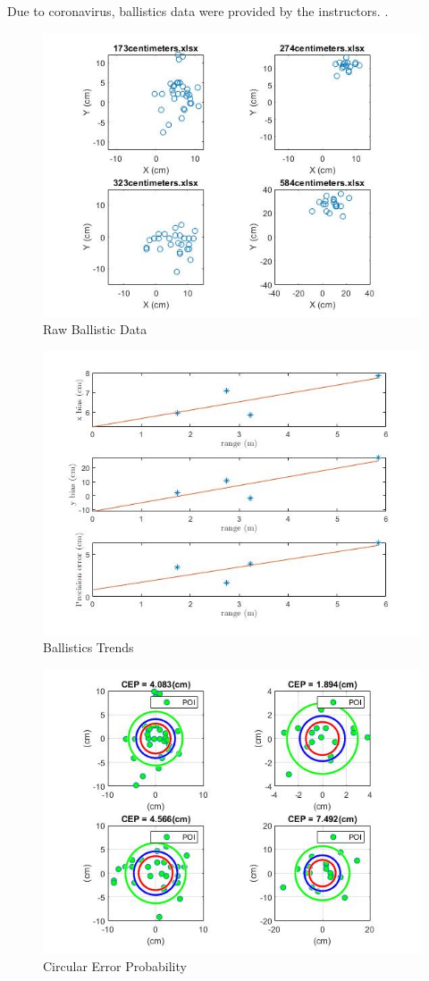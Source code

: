Due to coronavirus, ballistics data were provided by the instructors. .
\begin{figure}[h!]
    \centering
    \includegraphics[scale=.4]{raw impact.jpg}
    \caption{Raw Ballistic Data }
    \label{fig:raw datal}
\end{figure}
\begin{figure}[h!]
    \centering
    \includegraphics[scale=.4]{balistics trends.jpg}
    \caption{Ballistics Trends}
    \label{fig:my_label}
\end{figure}
\begin{figure}[h!]
    \centering
    \includegraphics[scale=.4]{cep's.jpg}
    \caption{Circular Error Probability}
    \label{fig:ceps}
\end{figure}